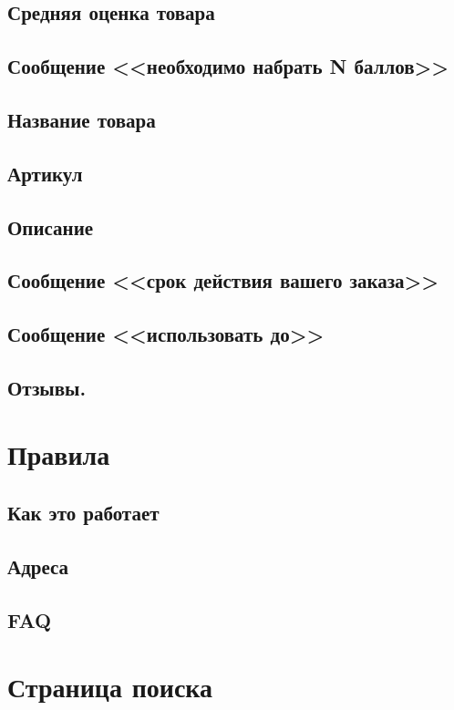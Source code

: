         \subsection{Средняя оценка товара}
        \subsection{Сообщение <<необходимо набрать N баллов>>}
        \subsection{Название товара}
        \subsection{Артикул}
        \subsection{Описание}
        \subsection{Сообщение <<срок действия вашего заказа>>}
        \subsection{Сообщение <<использовать до>>}
        \subsection{Отзывы.}

    \section{Правила}
        \subsection{Как это работает}
            \label{sec:rules_hiw}
        \subsection{Адреса}
        \subsection{FAQ}
            \label{page_faq}

    \section{Страница поиска}
        \label{search_page}

